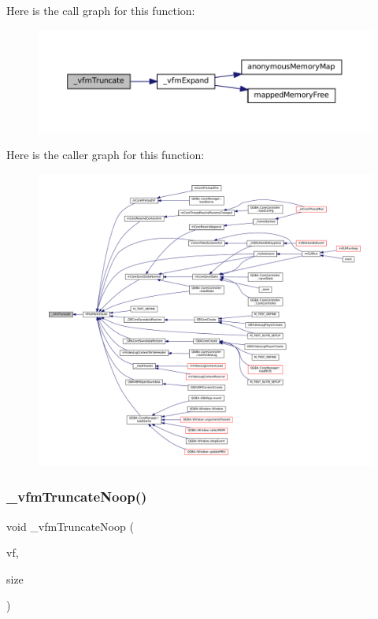 Here is the call graph for this function\+:
\nopagebreak
\begin{figure}[H]
\begin{center}
\leavevmode
\includegraphics[width=350pt]{vfs-mem_8c_ab011a37762636847c8dcdecd850069a4_cgraph}
\end{center}
\end{figure}
Here is the caller graph for this function\+:
\nopagebreak
\begin{figure}[H]
\begin{center}
\leavevmode
\includegraphics[width=350pt]{vfs-mem_8c_ab011a37762636847c8dcdecd850069a4_icgraph}
\end{center}
\end{figure}
\mbox{\label{vfs-mem_8c_a0fabe82c72e3197f1683775c0962f663}} 
\subsubsection{\texorpdfstring{\+\_\+vfm\+Truncate\+Noop()}{\_vfmTruncateNoop()}}
{\footnotesize\ttfamily void \+\_\+vfm\+Truncate\+Noop (\begin{DoxyParamCaption}\item[{struct V\+File $\ast$}]{vf,  }\item[{size\+\_\+t}]{size }\end{DoxyParamCaption})\hspace{0.3cm}{\ttfamily [static]}}

